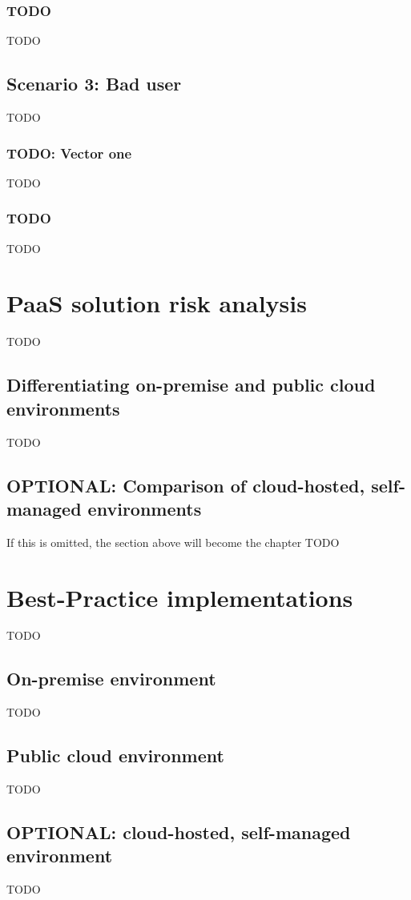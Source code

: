 \subsection{TODO}
TODO

\section{Scenario 3: Bad user}
TODO

\subsection{TODO: Vector one}
TODO

\subsection{TODO}
TODO

\chapter{PaaS solution risk analysis}
TODO

\section{Differentiating on-premise and public cloud environments}
TODO

\section{OPTIONAL: Comparison of cloud-hosted, self-managed environments}
If this is omitted, the section above will become the chapter
TODO

\chapter{Best-Practice implementations}
TODO

\section{On-premise environment}
TODO

\section{Public cloud environment}
TODO

\section{OPTIONAL: cloud-hosted, self-managed environment}
TODO

